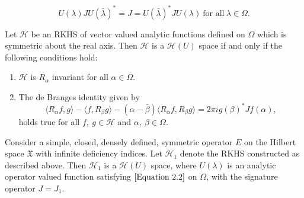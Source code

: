 \documentclass[10pt,a4paper]{amsart}
\begin{document}
\begin{equation}\label{Equation 2.2}
U(\lambda)JU(\bar{\lambda})^* = J = U(\bar{\lambda})^*JU(\lambda)~ \mbox{for all}~ \lambda \in \Omega.
\end{equation}

\begin{thm}\label{Theorem 3.1}
Let $\mathcal{H}$ be an RKHS of vector valued analytic functions defined on $\Omega$ which is symmetric about the real axis. Then $\mathcal{H}$ is a $\mathcal{H}(U)$ space if and only if the following conditions hold:
\begin{enumerate}
\item $\mathcal{H}$ is $R_{\alpha}$ invariant for all $\alpha \in \Omega$.
\item The de Branges identity given by  \begin{equation}
\langle R_{\alpha}f,g \rangle -\langle f,R_{\beta}g \rangle -(\alpha-\bar{\beta})\langle R_{\alpha}f, R_{\beta}g \rangle= 2\pi i g(\beta)^* Jf(\alpha),
\end{equation}
holds true for all $f,~g \in \mathcal{H}$ and $\alpha,~\beta \in \Omega$.
\end{enumerate}  
\end{thm}

\begin{thm} \label{Theorem 3.3}
Consider a simple, closed, densely defined, symmetric operator $E$ on the Hilbert space $\mathfrak{X}$ with infinite deficiency indices. Let $\mathcal{H}_1$ denote the RKHS constructed as described above. Then $\mathcal{H}_1$ is a $\mathcal{H}(U)$ space, where $U(\lambda)$ is an analytic operator valued function satisfying $\eqref{Equation 2.2}$ on $\Omega$, with the signature operator $J = J_1$.
\end{thm}
\end{document}
